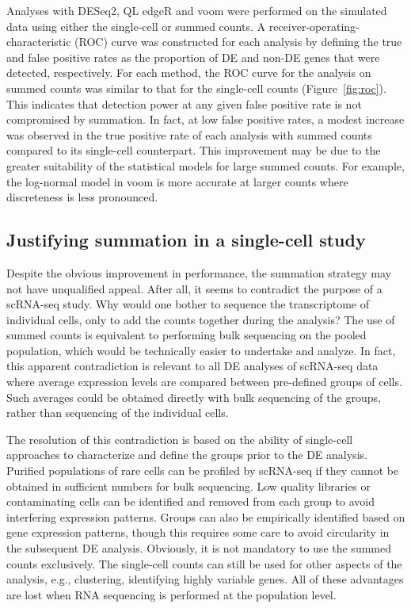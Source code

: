 \documentclass[oupdraft]{bio}
\begin{document}
Analyses with DESeq2, QL edgeR and voom were performed on the simulated data using either the single-cell or summed counts.
A receiver-operating-characteristic (ROC) curve was constructed for each analysis by defining the true and false positive rates as the proportion of DE and non-DE genes that were detected, respectively.
For each method, the ROC curve for the analysis on summed counts was similar to that for the single-cell counts (Figure~\ref{fig:roc}).
This indicates that detection power at any given false positive rate is not compromised by summation.
In fact, at low false positive rates, a modest increase was observed in the true positive rate of each analysis with summed counts compared to its single-cell counterpart.
This improvement may be due to the greater suitability of the statistical models for large summed counts.
For example, the log-normal model in voom is more accurate at larger counts where discreteness is less pronounced.

\subsection{Justifying summation in a single-cell study}
Despite the obvious improvement in performance, the summation strategy may not have unqualified appeal.
After all, it seems to contradict the purpose of a scRNA-seq study. 
Why would one bother to sequence the transcriptome of individual cells, only to add the counts together during the analysis?
The use of summed counts is equivalent to performing bulk sequencing on the pooled population, which would be technically easier to undertake and analyze.
In fact, this apparent contradiction is relevant to all DE analyses of scRNA-seq data where average expression levels are compared between pre-defined groups of cells.
Such averages could be obtained directly with bulk sequencing of the groups, rather than sequencing of the individual cells.

The resolution of this contradiction is based on the ability of single-cell approaches to characterize and define the groups prior to the DE analysis.
Purified populations of rare cells can be profiled by scRNA-seq if they cannot be obtained in sufficient numbers for bulk sequencing.
Low quality libraries or contaminating cells can be identified and removed from each group to avoid interfering expression patterns.
Groups can also be empirically identified based on gene expression patterns, though this requires some care to avoid circularity in the subsequent DE analysis.
Obviously, it is not mandatory to use the summed counts exclusively. 
The single-cell counts can still be used for other aspects of the analysis, e.g., clustering, identifying highly variable genes.
All of these advantages are lost when RNA sequencing is performed at the population level.
\end{document}
